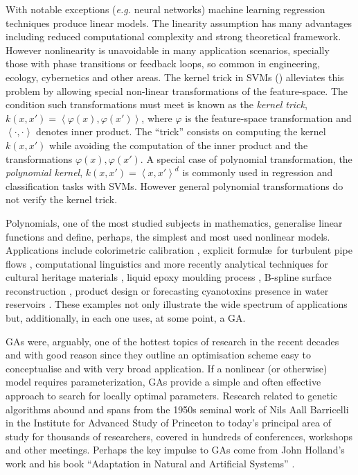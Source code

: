 \documentclass[preprint,authoryear,12pt]{elsarticle}
\newcommand{\at}[1]{\ensuremath{\!\left(#1\right)}}
\begin{document}
With notable exceptions (\emph{e.g.} neural networks) machine learning regression techniques produce linear models. The linearity assumption has many advantages including reduced computational complexity and strong the\-o\-re\-ti\-cal framework. However nonlinearity is unavoidable in many application scenarios, specially those with phase transitions or feedback loops, so common in engineering, ecology, cybernetics and other areas. The kernel trick in \acp{SVM} (\cite{scholkopf1997kernel, liang2012eigen, Bao:2013aa}) alleviates this problem by allowing special non-linear transformations of the feature-space. The condition such transformations must meet is known as the \emph{kernel trick}, $k\at{x,x'} = \left< \varphi\at{x}, \varphi\at{x'} \right>$, where $\varphi$ is the feature-space transformation and $\left<\cdot,\cdot\right>$ denotes inner product. The ``trick'' consists on computing the kernel $k\at{x,x'}$ while avoiding the computation of the inner product and the transformations $\varphi\at{x}, \varphi\at{x'}$. A special case of polynomial transformation, the \emph{polynomial kernel}, $k\at{x,x'} = \left<x,x'\right>^d$ is commonly used in regression and classification tasks with \acp{SVM}. However general polynomial transformations do not verify the kernel trick.

Polynomials, one of the most studied subjects in mathematics, generalise li\-ne\-ar functions and define, perhaps, the simplest and most used nonlinear models. Applications include colorimetric calibration \citep{Mendes:2005aa}, explicit formul\ae\ for turbulent pipe flows
 \citep{Davidson:1999aa}, computational linguistics \citep{Sanchez:2009aa} and more recently analytical techniques for cultural heritage materials \citep{Csefalvayova:2010aa}, liquid epoxy moulding process \citep{Chan:2011aa}, B-spline surface reconstruction \citep{Galvez:2012aa}, product design \citep{Chan:2012aa} or forecasting cyanotoxins presence in water reservoirs \citep{Garcia-Nieto:2013aa}. These examples not only illustrate the wide spectrum of applications but, additionally, in each one uses, at some point, a \ac{GA}.

\acp{GA} were, arguably, one of the hottest topics of research in the recent decades and with good reason since they outline an optimisation scheme easy to conceptualise and with very broad application. If a nonlinear (or otherwise) model requires parameterization, \acp{GA} provide a simple and often effective approach to search for locally optimal parameters. Research related to genetic algorithms abound and spans from the 1950s seminal work of Nils Aall Barricelli \citep{Barricelli:1962aa} in the Institute for Advanced Study of Princeton to today's principal area of study for thousands of researchers, covered in hundreds of conferences, workshops and other meetings. Perhaps the key impulse to \acp{GA} come from John Holland's work and his book ``Adaptation in Natural and Artificial Systems'' \citep{Holland:1975aa}. 
\end{document}
